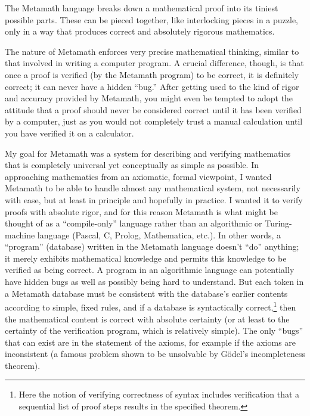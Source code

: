The Metamath language breaks down a mathematical proof into its tiniest
possible parts.  These can be pieced together, like interlocking
pieces in a puzzle, only in a way that produces correct and absolutely rigorous
mathematics.

The nature of Metamath enforces very precise mathematical
thinking, similar to that involved in writing a computer program.  A crucial
difference, though, is that once a proof is verified (by the Metamath program)
to be correct, it is definitely correct; it can never have a hidden
``bug.''  After getting used to the kind of rigor
and accuracy provided by Metamath, you might even be tempted to
adopt the attitude that a proof should never be considered correct until it
has been verified by a computer, just as you would not completely trust a
manual calculation until you have verified it on a
calculator.

My goal for Metamath was a system for describing and verifying
mathematics that is completely universal yet conceptually as simple as
possible.  In approaching mathematics from an axiomatic, formal viewpoint, I
wanted Metamath to be able to handle almost any mathematical system, not
necessarily with ease, but at least in principle and hopefully in practice. I
wanted it to verify proofs with absolute rigor, and for this reason Metamath
is what might be thought of as a ``compile-only'' language rather than an
algorithmic or Turing-machine language (Pascal, C, Prolog, Mathematica,
etc.).  In other words, a ``program'' (database) written in the Metamath
language doesn't ``do'' anything; it merely exhibits mathematical knowledge
and permits this knowledge to be verified as being correct.  A program in an
algorithmic language can potentially have hidden bugs as well as possibly being hard to understand.  But each token in a
Metamath database must be consistent with the database's earlier
contents according to simple, fixed rules, and if a database is syntactically
correct,\footnote{Here the notion of verifying correctness of syntax includes
verification that a sequential list of proof steps results in the specified
theorem.} then the mathematical content is correct with absolute certainty (or
at least to the certainty of the verification program, which is relatively
simple).  The only ``bugs'' that can exist are in the statement of the axioms,
for example if the axioms are inconsistent (a famous problem shown to be
unsolvable by G\"{o}del's incompleteness theorem).

